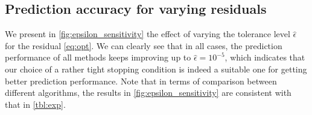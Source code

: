 \documentclass{article}
\newcommand{\alert}[1]{{#1}}
\theoremstyle{plain}
\theoremstyle{definition}
\theoremstyle{remark}
\begin{document}
\subsection{\alert{Prediction accuracy for varying residuals}}
\label{sec:varyingresiduals}
\alert{We present in \cref{fig:epsilon_sensitivity} the effect of varying the 
tolerance level $\hat{\epsilon}$ for the residual \cref{eq:opt}.
We can clearly see that in all cases, the prediction performance of
all methods keeps improving up to $\hat{\epsilon} = 10^{-5}$, which
indicates that our choice of a rather tight stopping condition is
indeed a suitable one for getting better prediction performance.
Note that in terms of comparison between different algorithms, 
the results in \cref{fig:epsilon_sensitivity} are consistent with that
in \cref{tbl:exp}.}
\end{document}
